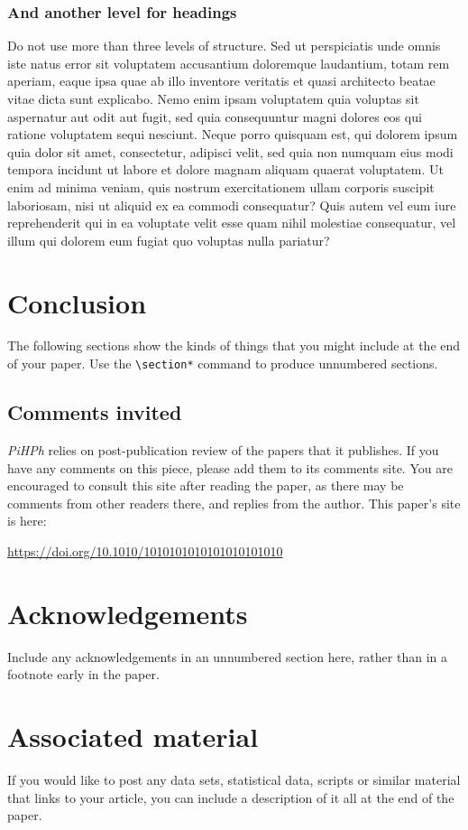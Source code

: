 \documentclass[article, a4paper, 12pt]{memoir}
\newcommand\thisdoi{10.1010/1010101010101010101010}
\newcommand\thisdoilink{https://doi.org/\thisdoi}
\newcommand\commentsinvited{
\begin{tcdoublebox}

\section*{\textcolor{pihphgreen}{Comments invited}}

\textit{PiHPh} relies on post-publication review of the papers that it publishes. If you have any comments on this piece, please add them to its comments site. You are encouraged to consult this site after reading the paper, as there may be comments from other readers there, and replies from the author. This paper's site is here:

\noindent \url{\thisdoilink}

\end{tcdoublebox}
}
\begin{document}
\subsubsection{And another level for headings}
\label{sec:anoth-level-head}

Do not use more than three levels of structure. Sed ut perspiciatis unde omnis iste natus error sit voluptatem accusantium doloremque laudantium, totam rem aperiam, eaque ipsa quae ab illo inventore veritatis et quasi architecto beatae vitae dicta sunt explicabo. Nemo enim ipsam voluptatem quia voluptas sit aspernatur aut odit aut fugit, sed quia consequuntur magni dolores eos qui ratione voluptatem sequi nesciunt. Neque porro quisquam est, qui dolorem ipsum quia dolor sit amet, consectetur, adipisci velit, sed quia non numquam eius modi tempora incidunt ut labore et dolore magnam aliquam quaerat voluptatem. Ut enim ad minima veniam, quis nostrum exercitationem ullam corporis suscipit laboriosam, nisi ut aliquid ex ea commodi consequatur? Quis autem vel eum iure reprehenderit qui in ea voluptate velit esse quam nihil molestiae consequatur, vel illum qui dolorem eum fugiat quo voluptas nulla pariatur?

\section{Conclusion}
\label{sec:conclusion}

The following sections show the kinds of things that you might include at the end of your paper. Use the \texttt{\textbackslash section*} command to produce unnumbered sections.

\commentsinvited %

\section*{Acknowledgements}
\label{sec:acknowledgements}


Include any acknowledgements in an unnumbered section here, rather than in a footnote early in the paper.

\section*{Associated material}
\label{sec:associated-material}

If you would like to post any data sets, statistical data, scripts or similar material that links to your article, you can include a description of it all at the end of the paper.
\end{document}
